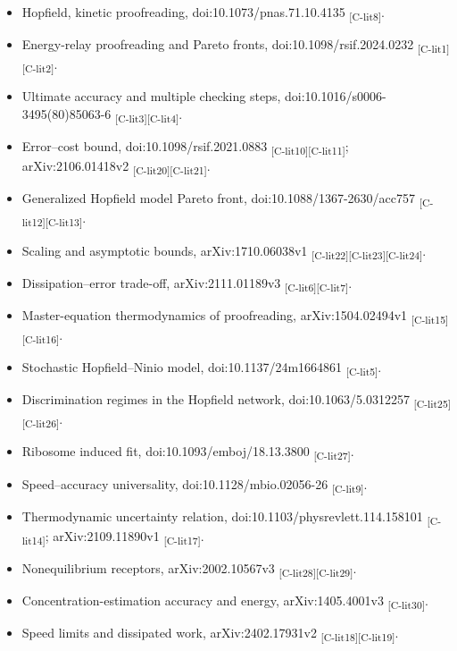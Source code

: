 \documentclass[
  english,
  twocolumn,
  10pt]{article}
\providecommand{\tightlist}{%
  \setlength{\itemsep}{0pt}\setlength{\parskip}{0pt}}
\begin{document}
\begin{itemize}
\tightlist
\item
  Hopfield, kinetic proofreading, doi:10.1073/pnas.71.10.4135
  \textsubscript{[C-lit8]}.
\item
  Energy-relay proofreading and Pareto fronts,
  doi:10.1098/rsif.2024.0232
  \textsubscript{[C-lit1]}\textsubscript{[C-lit2]}.
\item
  Ultimate accuracy and multiple checking steps,
  doi:10.1016/s0006-3495(80)85063-6
  \textsubscript{[C-lit3]}\textsubscript{[C-lit4]}.
\item
  Error--cost bound, doi:10.1098/rsif.2021.0883
  \textsubscript{[C-lit10]}\textsubscript{[C-lit11]}; arXiv:2106.01418v2
  \textsubscript{[C-lit20]}\textsubscript{[C-lit21]}.
\item
  Generalized Hopfield model Pareto front, doi:10.1088/1367-2630/acc757
  \textsubscript{[C-lit12]}\textsubscript{[C-lit13]}.
\item
  Scaling and asymptotic bounds, arXiv:1710.06038v1
  \textsubscript{[C-lit22]}\textsubscript{[C-lit23]}\textsubscript{[C-lit24]}.
\item
  Dissipation--error trade-off, arXiv:2111.01189v3
  \textsubscript{[C-lit6]}\textsubscript{[C-lit7]}.
\item
  Master-equation thermodynamics of proofreading, arXiv:1504.02494v1
  \textsubscript{[C-lit15]}\textsubscript{[C-lit16]}.
\item
  Stochastic Hopfield--Ninio model, doi:10.1137/24m1664861
  \textsubscript{[C-lit5]}.
\item
  Discrimination regimes in the Hopfield network, doi:10.1063/5.0312257
  \textsubscript{[C-lit25]}\textsubscript{[C-lit26]}.
\item
  Ribosome induced fit, doi:10.1093/emboj/18.13.3800
  \textsubscript{[C-lit27]}.
\item
  Speed--accuracy universality, doi:10.1128/mbio.02056-26
  \textsubscript{[C-lit9]}.
\item
  Thermodynamic uncertainty relation, doi:10.1103/physrevlett.114.158101
  \textsubscript{[C-lit14]}; arXiv:2109.11890v1
  \textsubscript{[C-lit17]}.
\item
  Nonequilibrium receptors, arXiv:2002.10567v3
  \textsubscript{[C-lit28]}\textsubscript{[C-lit29]}.
\item
  Concentration-estimation accuracy and energy, arXiv:1405.4001v3
  \textsubscript{[C-lit30]}.
\item
  Speed limits and dissipated work, arXiv:2402.17931v2
  \textsubscript{[C-lit18]}\textsubscript{[C-lit19]}.
\end{itemize}
\end{document}
